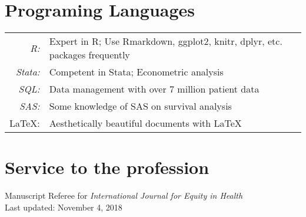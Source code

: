\documentclass[a4paper,10pt]{article}
\begin{document}
\section{Programing Languages}
\begin{tabular}{rl} 
	\textit{R:} & Expert in R; Use Rmarkdown, ggplot2, knitr, dplyr, etc. packages frequently\\
	\textit{Stata:} & Competent in Stata; Econometric analysis \\
	\textit{SQL:} & Data management with over 7 million patient data\\
	\textit{SAS:} & Some knowledge of SAS on survival analysis\\
	{\LaTeX}: & Aesthetically beautiful documents with \LaTeX
\end{tabular}


\section{Service to the profession}
Manuscript Referee for \emph{International Journal for Equity in Health}\\


\center Last updated: November 4, 2018
\end{document}
